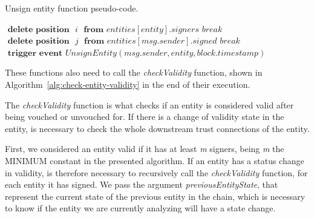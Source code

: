 \begin{algorithm}
  \caption{Unsign entity function pseudo-code.}
  \label{alg:unsign-entity}
  \begin{algorithmic}[1]
          \State $\textbf{ delete position } \textit{ i } \textbf{ from } entities[entity].signers$
          \State $break$
        \EndIf
      \EndFor
      \State
          \State $\textbf{ delete position } \textit{ j }\textbf{ from } entities[msg.sender].signed$
          \State $break$
        \EndIf
      \EndFor
      \State
      \State $\textbf{ trigger event } UnsignEntity(msg.sender, entity, block.timestamp)$
      \State
      \State {}
    \EndFunction
  \end{algorithmic}
\end{algorithm}

These functions also need to call the \textit{checkValidity} function, shown in Algorithm~\ref{alg:check-entity-validity} in the end of their execution.

The \textit{checkValidity} function is what checks if an entity is considered valid after being vouched or unvouched for.
If there is a change of validity state in the entity, is necessary to check the whole downstream trust connections of the entity.

First, we considered an entity valid if it has at least \textit{m} signers, being \textit{m} the MINIMUM constant in the presented algorithm.
If an entity has a status change in validity, is therefore necessary to recursively call the \textit{checkValidity} function, for each entity it has signed.
We pass the argument \textit{previousEntityState}, that represent the current state of the previous entity in the chain, which is necessary to know if the entity we are currently analyzing will have a state change.

